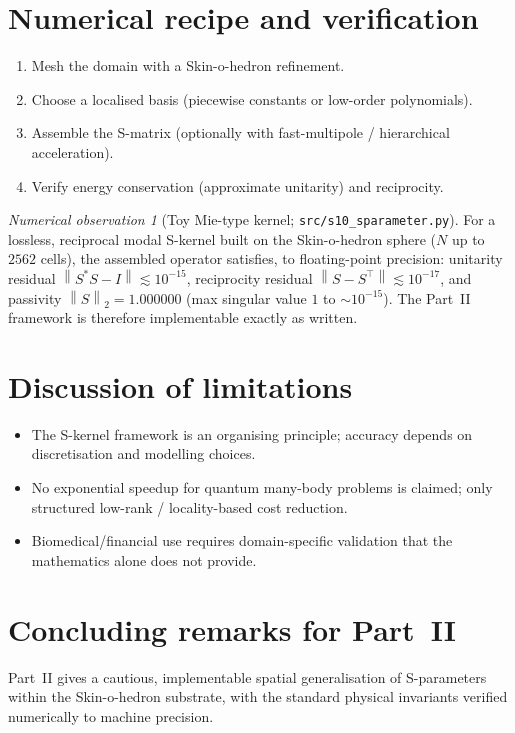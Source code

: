 \documentclass[11pt]{article}
\theoremstyle{plain}
\theoremstyle{definition}
\theoremstyle{remark}
\newtheorem{observation}[theorem]{Numerical observation}
\newcommand{\norm}[1]{\left\lVert #1 \right\rVert}
\begin{document}
\section{Numerical recipe and verification}
\begin{enumerate}
  \item Mesh the domain with a Skin-o-hedron refinement.
  \item Choose a localised basis (piecewise constants or low-order polynomials).
  \item Assemble the S-matrix (optionally with fast-multipole / hierarchical
    acceleration).
  \item Verify energy conservation (approximate unitarity) and reciprocity.
\end{enumerate}

\begin{observation}[Toy Mie-type kernel; \texttt{src/s10\_sparameter.py}]
\label{obs:s10}
For a lossless, reciprocal modal S-kernel built on the Skin-o-hedron sphere
($N$ up to $2562$ cells), the assembled operator satisfies, to floating-point
precision:
unitarity residual $\norm{S^{\!*}S-I}\lesssim 10^{-15}$,
reciprocity residual $\norm{S-S^{\!\top}}\lesssim 10^{-17}$,
and passivity $\norm{S}_2=1.000000$ (max singular value $1$ to $\sim 10^{-15}$).
The Part~II framework is therefore implementable exactly as written.
\end{observation}

\section{Discussion of limitations}
\begin{itemize}
  \item The S-kernel framework is an organising principle; accuracy depends on
    discretisation and modelling choices.
  \item No exponential speedup for quantum many-body problems is claimed; only
    structured low-rank / locality-based cost reduction.
  \item Biomedical/financial use requires domain-specific validation that the
    mathematics alone does not provide.
\end{itemize}

\section{Concluding remarks for Part~II}
Part~II gives a cautious, implementable spatial generalisation of S-parameters
within the Skin-o-hedron substrate, with the standard physical invariants
verified numerically to machine precision.
\end{document}
